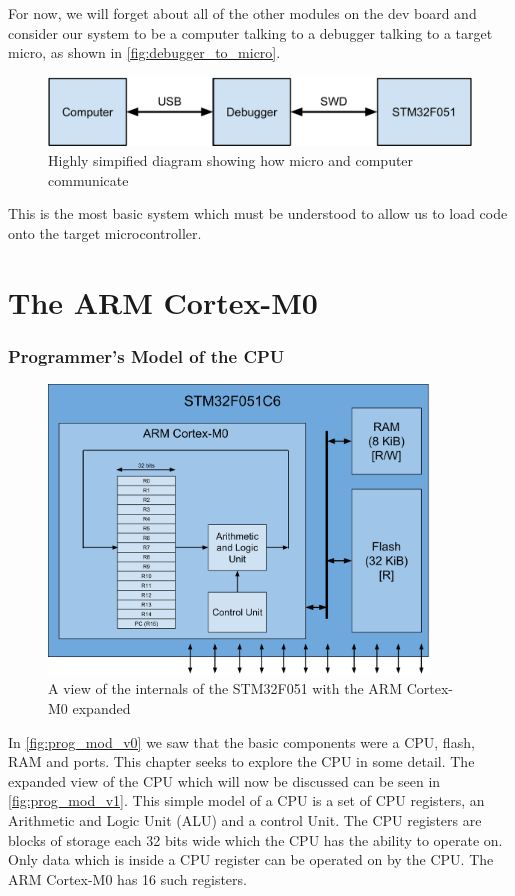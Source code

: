     For now, we will forget about all of the other modules on the dev board and consider our system to be a computer talking to a debugger talking to a target micro, as shown in \autoref{fig:debugger_to_micro}. 

\begin{figure}[t]
  \includegraphics[width=\textwidth]{./week1/debugger_to_micro.pdf}
  \caption{Highly simpified diagram showing how micro and computer communicate}
  \label{fig:debugger_to_micro}
\end{figure}

This is the most basic system which must be understood to allow us to load code onto the target microcontroller.



\chapter{The ARM Cortex-M0}

\subsection{Programmer's Model of the CPU}
\begin{figure}[t]
  \centering
  \includegraphics[width=0.9\textwidth]{./week1/programmers_model_v1.pdf}
  \caption{A view of the internals of the STM32F051 with the ARM Cortex-M0 expanded}
  \label{fig:prog_mod_v1}
\end{figure}
In \autoref{fig:prog_mod_v0} we saw that the basic components were a CPU, flash, RAM and ports. This chapter seeks to explore the CPU in some detail. The expanded view of the CPU which will now be discussed can be seen in \autoref{fig:prog_mod_v1}. This simple model of a CPU is a set of CPU registers, an Arithmetic and Logic Unit (ALU) and a control Unit. The CPU registers are blocks of storage each 32 bits wide which the CPU has the ability to operate on. Only data which is inside a CPU register can be operated on by the CPU. The ARM Cortex-M0 has 16 such registers. 

